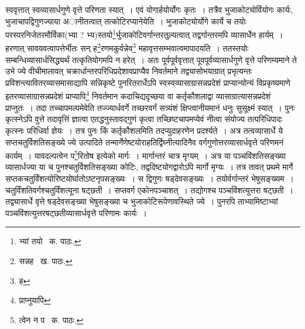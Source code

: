 \documentclass[11pt, openany]{book}
\begin{document}
\noindent स्ववृत्तात् स्वव्यासार्धगुणे वृत्ते परिणता स्यात्~। एवं योगार्हयोर्योगः कृतः~। तत्रैव भुजाकोट्योर्वियोगः कार्यः, भुजाचापद्विगुणज्याया अानीतत्वात् तत्कोटिरप्यानेयेति~। भुजाकोट्योर्योगे कार्ये च तयोः परस्परनिजेतरमौर्विका(भ्या ? भ्य)स्तयो\renewcommand{\thefootnote}{१}\footnote{भ्यां तयो \textendash\ क. पाठः.}र्भुजाकोटिवर्गान्तरतुल्यत्वात् तद्वर्गान्तरमपि व्यासार्धेन हार्यम्~। हरणात् सावयवत्वापत्तेर्भीतः सन् ह\renewcommand{\thefootnote}{२}\footnote{सन्नह \textendash\ ख. पाठः.}रणमकुर्वन्नेव\renewcommand{\thefootnote}{३}\footnote{ह} महावृत्तसम्भवात्वमापादयति~। ततस्तयोः सम्बन्धिव्यासार्धसिद्ध्यर्थं तत्कृतियोगमपि न हरेत्~। अतः पूर्वपूर्ववृत्तात् पूवपूर्वव्यासार्धगुणे वृत्ते परिणम्यमाने ते उभे ज्ये वीचीमालावत् चक्रार्धान्तरपरिधिप्रदेशावप्राप्यैव निवर्तमाने तद्व्यासोभयाग्रात् प्रभृत्यन्तः प्रविशन्त्यावितरव्यासमासाद्यापि सन्निकृष्टे पुनरितरार्धेऽपि स्वस्वव्यासाग्रासन्नप्रदेशं प्राप्यान्योन्यं विप्रकृष्यमाणे इतरव्यासाग्रासन्नप्रदेशं प्राप्यापि\renewcommand{\thefootnote}{४}\footnote{प्राप्नुयापि} निवर्तमान कदाचिद्यदृच्छया वा कर्तृकौशलाद्वा व्यासाग्रात्यासन्नप्रदेशं प्राप्नुतः~। तदा तच्चापमल्पमेवेति तज्ज्यार्धवर्गे तच्छरवर्गं सत्र्यंशं क्षिप्त्वानीयमानं धनुः सुसूक्ष्मं स्यात्~। पुनः कृत्स्नेऽपि वुत्ते तदावृत्तिं ज्ञात्वा एतद्धनुस्तावद्गुणं कृत्वा तच्छिष्टचापमप्येवं नीत्वा संयोज्य तत्परिधिपादः कृत्स्नः परिधिर्वा ज्ञेयः~। तत्र पुनः किं कर्तृकौशलमिति तदप्युदाहरणेन प्रदर्श्यते~। अत्र तत्वव्यासार्धे ये सप्तचतुर्विशतिसङ्ख्ये ज्ये उत्पादिते तन्मार्गेणेष्टयोराहतिर्द्विघ्नीत्यादिनैव वर्गगुणोत्तरव्यासार्धवृत्ते परिणमनं कार्यम्~। यावदल्पत्वेन प\renewcommand{\thefootnote}{५}\footnote{त्वेन न प \textendash\ क. पाठः.}रितोष इत्येको मार्गः~। मार्गान्तरं चात्र मृग्यम्~। अत्र या पञ्चविंशतिसङ्ख्या व्यासार्धज्या या च पुनश्चतुर्विशतिसङ्ख्या कोटिः, तद्वदिष्टयोगद्वारोऽपि मार्गो मृग्यः~। तत्र तावत् प्रथमे मार्गे सप्तकचतुर्विंशत्योरिष्टयोर्घातोऽष्टनृपसङ्ख्यः~। स द्विगुणः षड्देवसङ्ख्यः~। तयोर्वर्गान्तरं भेषुसङ्ख्यम~। चतुर्विंशतिवर्गश्चतुर्विंशत्यूना षट्छती~। सप्तवर्ग एकोनपञ्चाशत्~। तद्योगश्च पञ्चविंशत्युत्तरा षट्छती~। तद्व्यासार्धे वृत्ते षड्देवसङ्ख्या भेषुसङ्ख्या च भुजाकोटिरूपेणावस्थिते ज्ये~। पुनरपि ताभ्यामिष्टाभ्यां पञ्चविंशत्युत्तरषट्छतीव्यासार्धवृत्ते परिणामः कार्यः~।

\newpage
\end{document}
